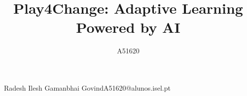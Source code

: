 \def\thetitle{%
 Play4Change: Adaptive Learning Powered by AI
}
\def\theauthor{%
 A51620
}

\title{ \thetitle }

\author{A51620}{Radesh Ilesh Gamanbhai Govind}{A51620@alunos.isel.pt}


